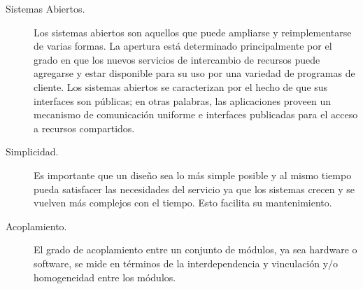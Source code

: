 \begin{description}
		\item[{Sistemas Abiertos.}]  Los \gls{sistemas abiertos}  son aquellos que  puede ampliarse y reimplementarse de varias formas. La apertura  está determinado principalmente por el grado en que los nuevos servicios de intercambio de recursos puede agregarse y estar disponible para su uso por una variedad de programas de cliente.
		Los sistemas abiertos se caracterizan por el hecho de que sus interfaces son públicas; en otras palabras, las aplicaciones proveen un mecanismo de comunicación uniforme e interfaces  publicadas para el acceso a recursos compartidos.
		
		\item [{Simplicidad.}]  Es importante que un diseño sea lo más simple posible y al mismo tiempo pueda satisfacer las necesidades del servicio ya que los sistemas crecen y se vuelven más complejos con el tiempo. Esto facilita su mantenimiento.
		
		\item[{Acoplamiento.}] 
		
		El grado de \gls{acoplamiento} entre un conjunto de módulos, ya sea hardware o software, se mide en términos de la interdependencia y vinculación y/o homogeneidad entre los módulos. 
		
		
		

\end{description}
